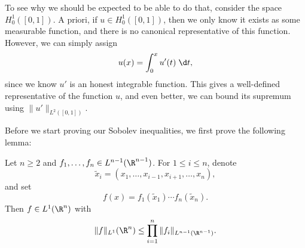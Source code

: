 \documentclass[a4paper]{article}
\begin{document}
To see why we should be expected to be able to do that, consider the space $H_0^1([0, 1])$. A priori, if $u \in H_0^1([0, 1])$, then we only know it exists as some measurable function, and there is no canonical representative of this function. However, we can simply assign
\[
  u(x) = \int_0^x u'(t)\;\d t,
\]
since we know $u'$ is an honest integrable function. This gives a well-defined representative of the function $u$, and even better, we can bound its supremum using $\|u'\|_{L^2([0, 1])}$.

Before we start proving our Sobolev inequalities, we first prove the following lemma:
\begin{lemma}
  Let $n \geq 2$ and $f_1, \ldots, f_n \in L^{n - 1}(\R^{n - 1})$. For $1 \leq i \leq n$, denote
  \[
    \tilde{x}_i = (x_1, \ldots, x_{i - 1}, x_{i + 1}, \ldots, x_n),
  \]
  and set
  \[
    f(x) = f_1(\tilde{x}_1) \cdots f_n(\tilde{x}_n).
  \]
  Then $f \in L^1(\R^n)$ with
  \[
    \|f\|_{L^1}(\R^n) \leq \prod_{i = 1}^n \|f_i\|_{L^{n - 1}(\R^{n - 1})}.
  \]
\end{lemma}
\end{document}

